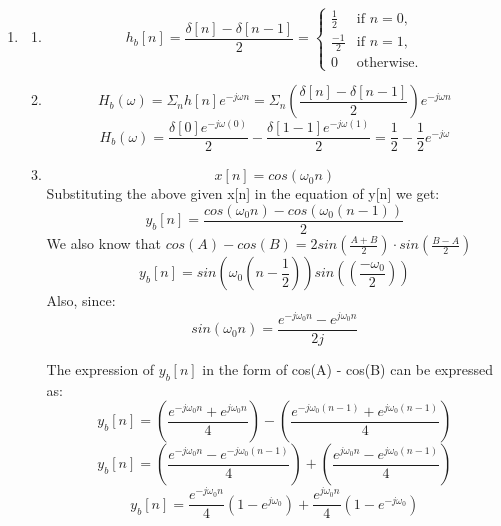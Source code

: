 \documentclass{article}
\begin{document}
\begin{enumerate}
\begin{enumerate}
  
        \item 
        \begin{enumerate}
            \item 
                \[
                    h_b[n] = \frac{\delta[n] - \delta[n-1]}{2} 
                        = 
                        \begin{cases} 
                        \frac{1}{2} & \text{if } n = 0, \\
                        \frac{-1}{2} & \text{if } n = 1, \\
                        0 & \text{otherwise.}
                        \end{cases}
                \]
            \item 
                \[
                    H_b(\omega) = \Sigma_nh[n]e^{-j\omega n} = \Sigma_n(\frac{\delta[n] - \delta[n-1]}{2})e^{-j\omega n}
                \]
                \[
                    H_b(\omega) = \frac{ \delta[0]e^{-j\omega (0)} }{2} - \frac{ \delta[1-1]e^{-j\omega (1)} }{2} = \frac{1}{2} - \frac{1}{2}e^{-j\omega}
                \]
            \item
                \[
                    x[n] = cos(\omega_0n)
                \]
                Substituting the above given x[n] in the equation of y[n] we get:
                \[
                    y_b[n] = \frac{ cos(\omega_0n) - cos(\omega_0(n-1)) }{2}
                \]
                We also know that $cos(A) - cos(B) = 2 sin\left(\frac{A + B}{2} \right) \cdot sin\left( \frac{B-A}{2} \right)$
                \[
                    y_b[n] = sin\left(\omega_0( n - \frac{1}{2} )\right)sin\left((\frac{-\omega_0}{2} )\right)
                \]
                Also, since: 
                \[
                    sin(\omega_0 n) = \frac{e^{-j\omega_0n} - e^{j\omega_0n}}{2j}
                \]




 The expression of $y_b[n]$ in the form of cos(A) - cos(B) can be expressed as:
                \[
                    y_b[n] = \left( \frac{ e^{-j\omega_0n} + e^{j\omega_0n}}{4} \right) - \left( \frac{ e^{-j\omega_0(n-1)} + e^{j\omega_0(n-1)}}{4} \right)
                \]
                \[
                    y_b[n] = \left( \frac{ e^{-j\omega_0n} - e^{-j\omega_0(n-1)}}{4} \right) + \left( \frac{ e^{j\omega_0n} - e^{j\omega_0(n-1)}}{4} \right)
                \]
                \[
                    y_b[n] = \frac{e^{-j\omega_0n}}{4} \left( 1 - e^{j\omega_0} \right) + \frac{e^{j\omega_0n}}{4} \left( 1 - e^{-j\omega_0} \right)
                \]


\end{enumerate}
\end{enumerate}
\end{enumerate}
\end{document}
